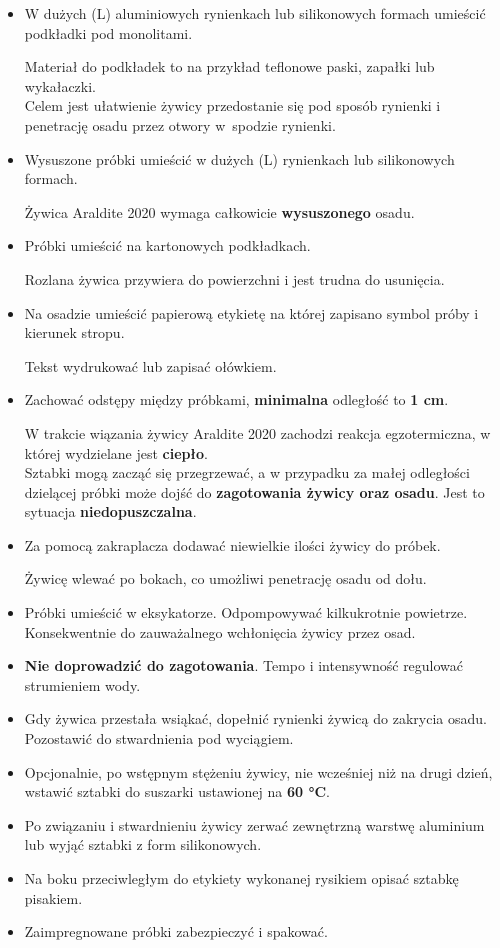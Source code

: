 \documentclass[
  letterpaper,
  DIV=11,
  numbers=noendperiod]{scrreprt}
\begin{document}
\begin{itemize}
\item
  W dużych (L) aluminiowych rynienkach lub silikonowych formach umieścić
  podkładki pod monolitami.

  Materiał do podkładek to na przykład teflonowe paski, zapałki lub
  wykałaczki.\\
  Celem jest ułatwienie żywicy przedostanie się pod sposób rynienki i
  penetrację osadu przez otwory w~spodzie rynienki.
\item
  Wysuszone próbki umieścić w dużych (L) rynienkach lub silikonowych
  formach.

  Żywica Araldite 2020 wymaga całkowicie \textbf{wysuszonego} osadu.
\item
  Próbki umieścić na kartonowych podkładkach.

  Rozlana żywica przywiera do powierzchni i jest trudna do usunięcia.
\item
  Na osadzie umieścić papierową etykietę na której zapisano symbol próby
  i kierunek stropu.

  Tekst wydrukować lub zapisać ołówkiem.
\item
  Zachować odstępy między próbkami, \textbf{minimalna} odległość to
  \textbf{1 cm}.

  W trakcie wiązania żywicy Araldite 2020 zachodzi reakcja
  egzotermiczna, w której wydzielane jest \textbf{ciepło}.\\
  Sztabki mogą zacząć się przegrzewać, a w przypadku za małej odległości
  dzielącej próbki może dojść do \textbf{zagotowania żywicy oraz osadu}.
  Jest to sytuacja \textbf{niedopuszczalna}.
\item
  Za pomocą zakraplacza dodawać niewielkie ilości żywicy do próbek.

  Żywicę wlewać po bokach, co umożliwi penetrację osadu od dołu.
\item
  Próbki umieścić w eksykatorze. Odpompowywać kilkukrotnie powietrze.
  Konsekwentnie do zauważalnego wchłonięcia żywicy przez osad.
\item
  \textbf{Nie doprowadzić do zagotowania}. Tempo i intensywność
  regulować strumieniem wody.
\item
  Gdy żywica przestała wsiąkać, dopełnić rynienki żywicą do zakrycia
  osadu. Pozostawić do stwardnienia pod wyciągiem.
\item
  Opcjonalnie, po wstępnym stężeniu żywicy, nie wcześniej niż na drugi
  dzień, wstawić sztabki do suszarki ustawionej na \textbf{60 °C}.
\item
  Po związaniu i stwardnieniu żywicy zerwać zewnętrzną warstwę aluminium
  lub wyjąć sztabki z form silikonowych.
\item
  Na boku przeciwległym do etykiety wykonanej rysikiem opisać sztabkę
  pisakiem.
\item
  Zaimpregnowane próbki zabezpieczyć i spakować.\newpage{}
\end{itemize}
\end{document}
